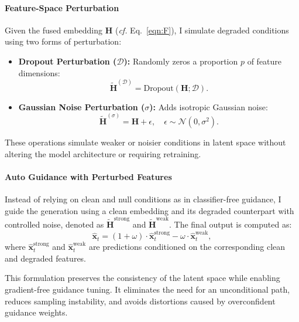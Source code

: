 \documentclass[a4paper,12pt]{article}
\begin{document}
\paragraph{Feature-Space Perturbation}
Given the fused embedding $\mathbf{H}$ (\textit{cf.} Eq.~\eqref{eqn:F}), I simulate degraded conditions using two forms of perturbation:

\begin{itemize}
    \item \textbf{Dropout Perturbation ($\mathcal{D}$):} Randomly zeros a proportion $p$ of feature dimensions:
    \begin{equation}
        \tilde{\mathbf{H}}^{(\mathcal{D})} = \text{Dropout}(\mathbf{H}; \mathcal{D}).
    \end{equation}

    \item \textbf{Gaussian Noise Perturbation ($\sigma$):} Adds isotropic Gaussian noise:
    \begin{equation}
        \tilde{\mathbf{H}}^{(\sigma)} = \mathbf{H} + \epsilon, \quad \epsilon \sim \mathcal{N}(0, \sigma^2).
    \end{equation}
\end{itemize}

These operations simulate weaker or noisier conditions in latent space without altering the model architecture or requiring retraining.

\paragraph{Auto Guidance with Perturbed Features}
Instead of relying on clean and null conditions as in classifier-free guidance, I guide the generation using a clean embedding and its degraded counterpart with controlled noise, denoted as $\tilde{\mathbf{H}}^{\text{strong}}$ and $\tilde{\mathbf{H}}^{\text{weak}}$. The final output is computed as:
\begin{equation}
\hat{\mathbf{x}}_t = (1 + \omega) \cdot \hat{\mathbf{x}}_t^{\text{strong}} - \omega \cdot \hat{\mathbf{x}}_t^{\text{weak}},
\end{equation}
where $\hat{\mathbf{x}}_t^{\text{strong}}$ and $\hat{\mathbf{x}}_t^{\text{weak}}$ are predictions conditioned on the corresponding clean and degraded features.

This formulation preserves the consistency of the latent space while enabling gradient-free guidance tuning. It eliminates the need for an unconditional path, reduces sampling instability, and avoids distortions caused by overconfident guidance weights.
\end{document}
